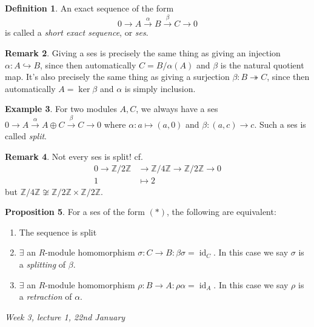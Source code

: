 \documentclass{article}
\newcommand{\Z}{\mathbb{Z}}
\newcommand{\id}{\operatorname{id}}
\theoremstyle{definition}
\newtheorem{defn}{Definition}[subsection]
\newtheorem{prop}[defn]{Proposition}
\newtheorem{example}[defn]{Example}
\newtheorem{remark}[defn]{Remark}
\begin{document}
\begin{defn}
An exact sequence of the form
\[
\tag{\ast}
0\rightarrow A\xrightarrow{\alpha} B\xrightarrow{\beta} C\rightarrow 0
\]
is called a \textit{short exact sequence}, or \textit{ses}.
\end{defn}

\begin{remark}
Giving a ses is precisely the same thing as giving an injection $\alpha:A\hookrightarrow B$, since then automatically $C=B/\alpha(A)$ and $\beta$ is the natural quotient map. It's also precisely the same thing as giving a surjection $\beta:B\twoheadrightarrow C$, since then automatically $A=\ker\beta$ and $\alpha$ is simply inclusion.
\end{remark}

\begin{example}
For two modules $A,C$, we always have a ses $0\rightarrow A\xrightarrow{\alpha}A\oplus C\xrightarrow{\beta}C\rightarrow 0$ where $\alpha:a\mapsto (a,0)$ and $\beta:(a,c)\rightarrow c$. Such a ses is called \textit{split}.
\end{example}

\begin{remark}
Not every ses is split! cf.
\[
\begin{aligned}
0\rightarrow\Z/2\Z&\rightarrow\Z/4\Z\rightarrow\Z/2\Z\rightarrow 0 \\
1&\mapsto 2
\end{aligned}
\]
but $\Z/4\Z\not\cong\Z/2\Z\times\Z/2\Z$.
\end{remark}

\begin{prop}
For a ses of the form $(\ast)$, the following are equivalent:
\begin{enumerate}
\item The sequence is split
\item $\exists$ an $R$-module homomorphism $\sigma:C\rightarrow B:\beta\sigma=\id_C$. In this case we say $\sigma$ is a \textit{splitting} of $\beta$.
\item $\exists$ an $R$-module homomorphism $\rho:B\rightarrow A:\rho\alpha=\id_A$. In this case we say $\rho$ is a \textit{retraction} of $\alpha$.
\end{enumerate}
\end{prop}

\begin{flushright}
\textit{Week 3, lecture 1, 22nd January}
\end{flushright}
\end{document}
